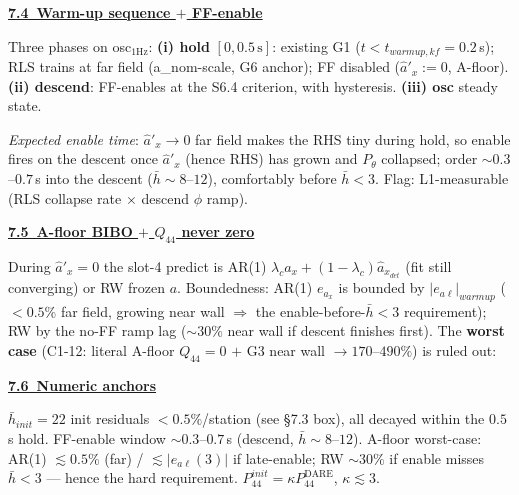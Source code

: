 \documentclass[11pt,a4paper,fontset=none]{ctexart}
\newcommand{\lc}{\lambda_c}
\newcommand{\hd}[1]{\par\medskip\noindent\underline{\textbf{#1}}\par\nobreak\vspace{0.2ex}}
\newcommand{\adet}{a_{x_{det}}}
\newcommand{\ealev}{e_{a\ell}}
\begin{document}
\hd{7.4\ Warm-up sequence $+$ FF-enable}
Three phases on osc$_{1\mathrm{Hz}}$: \textbf{(i) hold} $[0,0.5\,\text{s}]$: existing G1 ($t{<}t_{warmup,kf}{=}0.2$\,s); RLS trains at far field (a\_nom-scale, G6 anchor); FF disabled ($\hat a'_x{:=}0$, A-floor). \textbf{(ii) descend}: FF-enables at the S6.4 criterion, with hysteresis. \textbf{(iii) osc} steady state.

\noindent{}

\textit{Expected enable time}: $\hat a'_x\!\to\!0$ far field makes the RHS tiny during hold, so enable fires on the descent once $\hat a'_x$ (hence RHS) has grown and $P_\theta$ collapsed; order $\sim\!0.3$--$0.7$\,s into the descent ($\bar h\!\sim\!8$--$12$), comfortably before $\bar h\!<\!3$. Flag: L1-measurable (RLS collapse rate $\times$ descend $\phi$ ramp).

\hd{7.5\ A-floor BIBO $+$ $Q_{44}$ never zero}
During $\hat a'_x{=}0$ the slot-4 predict is AR(1) $\lc a_x+(1-\lc)\hat\adet$ (fit still converging) or RW frozen $a$. Boundedness: AR(1) $e_{a_x}$ is bounded by $|\ealev|_{warmup}$ ($<\!0.5\%$ far field, growing near wall $\Rightarrow$ the enable-before-$\bar h{<}3$ requirement); RW by the no-FF ramp lag ($\sim\!30\%$ near wall if descent finishes first). The \textbf{worst case} (C1-12: literal A-floor $Q_{44}{=}0$ $+$ G3 near wall $\to 170$--$490\%$) is ruled out:

\noindent{}

\hd{7.6\ Numeric anchors}
{\small $\bar h_{init}{=}22$ init residuals $<\!0.5\%$/station (see \S7.3 box), all decayed within the $0.5$\,s hold. FF-enable window $\sim\!0.3$--$0.7$\,s (descend, $\bar h\!\sim\!8$--$12$). A-floor worst-case: AR(1) $\lesssim\!0.5\%$ (far) / $\lesssim\!|\ealev(3)|$ if late-enable; RW $\sim\!30\%$ if enable misses $\bar h{<}3$ --- hence the hard requirement. $P_{44}^{init}{=}\kappa P_{44}^{\mathrm{DARE}}$, $\kappa\!\lesssim\!3$.}
\end{document}
